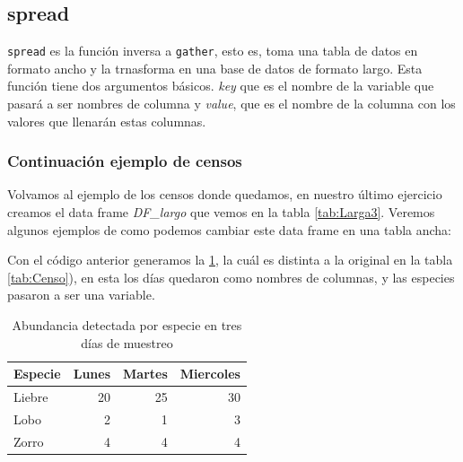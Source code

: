\documentclass[]{book}
\newenvironment{Shaded}{\begin{snugshade}}{\end{snugshade}}
\newcommand{\DataTypeTok}[1]{\textcolor[rgb]{0.13,0.29,0.53}{#1}}
\newcommand{\KeywordTok}[1]{\textcolor[rgb]{0.13,0.29,0.53}{\textbf{#1}}}
\newcommand{\NormalTok}[1]{#1}
\newcommand{\OperatorTok}[1]{\textcolor[rgb]{0.81,0.36,0.00}{\textbf{#1}}}
\newcommand{\StringTok}[1]{\textcolor[rgb]{0.31,0.60,0.02}{#1}}
\begin{document}
\hypertarget{spread}{%
\subsection{spread}\label{spread}}

\texttt{spread} es la función inversa a \texttt{gather}, esto es, toma
una tabla de datos en formato ancho y la trnasforma en una base de datos
de formato largo. Esta función tiene dos argumentos básicos. \emph{key}
que es el nombre de la variable que pasará a ser nombres de columna y
\emph{value}, que es el nombre de la columna con los valores que
llenarán estas columnas.

\hypertarget{continuacion-ejemplo-de-censos}{%
\subsubsection{Continuación ejemplo de
censos}\label{continuacion-ejemplo-de-censos}}

Volvamos al ejemplo de los censos donde quedamos, en nuestro último
ejercicio creamos el data frame \emph{DF\_largo} que vemos en la tabla
\ref{tab:Larga3}. Veremos algunos ejemplos de como podemos cambiar este
data frame en una tabla ancha:

\begin{Shaded}
\end{Shaded}

Con el código anterior generamos la \ref{tab:Ancha1}, la cuál es
distinta a la original en la tabla \ref{tab:Censo}), en esta los días
quedaron como nombres de columnas, y las especies pasaron a ser una
variable.

\begin{table}

\caption{\label{tab:Ancha1}Abundancia detectada por especie en tres días de muestreo}
\centering
\begin{tabular}[t]{lrrr}
\toprule
Especie & Lunes & Martes & Miercoles\\
\midrule
Liebre & 20 & 25 & 30\\
Lobo & 2 & 1 & 3\\
Zorro & 4 & 4 & 4\\
\bottomrule
\end{tabular}
\end{table}
\end{document}
